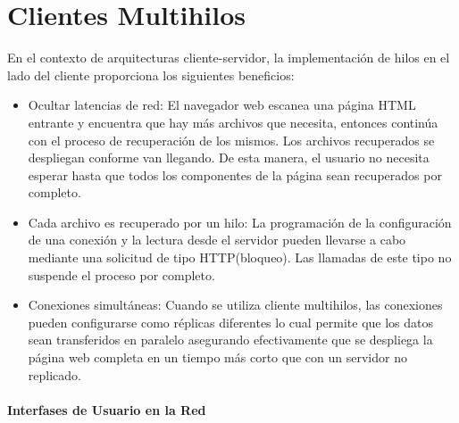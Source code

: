 \section{Clientes Multihilos}  

En el contexto de arquitecturas cliente-servidor, la implementación de hilos en el lado del cliente  proporciona los siguientes beneficios: 
 
		\begin{itemize}		
 
			\item   Ocultar latencias de red: El navegador web escanea una página HTML entrante y encuentra que hay más archivos que necesita, entonces  continúa con el proceso de recuperación de los mismos. Los archivos recuperados se despliegan conforme van llegando. De esta manera, el usuario no necesita esperar hasta que todos los componentes de la página sean recuperados por completo.
			
			\item Cada archivo es recuperado por un hilo: La programación de la configuración de una conexión y la lectura desde el servidor pueden llevarse a cabo mediante una  solicitud de tipo HTTP(bloqueo). Las llamadas de este tipo no suspende el proceso por completo.
			
			\item   Conexiones simultáneas:
			 	Cuando se utiliza cliente multihilos, las conexiones pueden configurarse como réplicas diferentes lo cual permite que los datos sean transferidos en paralelo asegurando efectivamente que se despliega 	la página web completa en un tiempo más corto que con un servidor no replicado.
		\end{itemize}        
 

	 
 

	
	\paragraph{Interfases de Usuario en la Red} 

